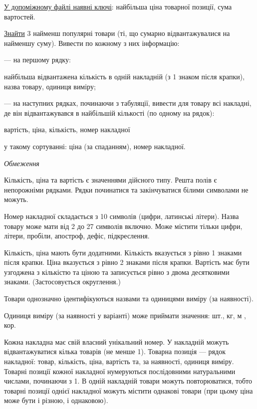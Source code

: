 \documentclass[11pt, ukrainian]{article}
\begin{document}
\underline{У допоміжному файлі наявні ключі}: найбільша ціна товарної позиції, сума вартостей.

\underline{Знайти} 3 найменш популярні товари (ті, що сумарно відвантажувалися на найменшу суму). Вивести по кожному з них інформацію:\par
{\noindent}--- на першому рядку:\par
найбільша відвантажена кількість в одній накладній (з 1 знаком після крапки),  назва товару, одиниця виміру;

{\noindent}--- на наступних рядках, починаючи з табуляції, вивести для товару всі накладні, де він відвантажувався в найбільшій кількості (по одному на рядок):\par
вартість, ціна, кількість, номер накладної

{\noindent}у такому сортуванні: ціна (за спаданням), номер накладної.


\bigskip\textit{Обмеження}

Кількість, ціна та вартість є значеннями дійсного типу.
Решта полів є непорожніми рядками.
Рядки починатися та закінчуватися білими символами не можуть.

Номер накладної складається з 10 символів (цифри, латинські літери).
Назва товару може мати від 2 до 27 символів включно.
Може містити тільки цифри, літери, пробіли, апостроф, дефіс, підкреслення.

Кількість, ціна мають бути додатними.
Кількість вказується з рівно 1 знаками після крапки.
Ціна вказується з рівно 2 знаками після крапки.
Вартість має бути узгоджена з кількістю та ціною та записується рівно з двома десятковими знаками.
(Застосовується округлення.)

Товари однозначно ідентифікуються назвами та одиницями виміру (за наявності).

Одиниця виміру (за наявності у варіанті) може приймати значення: шт., кг, м , кор.

Кожна накладна має свій власний унікальний номер.
У накладній можуть відвантажуватися кілька товарів (не менше 1).
Товарна позиція --- рядок накладної: товар, кількість, ціна, вартість та, за наявності, одиниця виміру.
Товарні позиції кожної накладної нумеруються послідовними натуральними числами, починаючи з 1.
В одній накладній товари можуть повторюватися, 
тобто товарні позиції однієї накладної можуть містити однакові товари 
(при цьому ціна може бути і різною, і однаковою).
\end{document}

